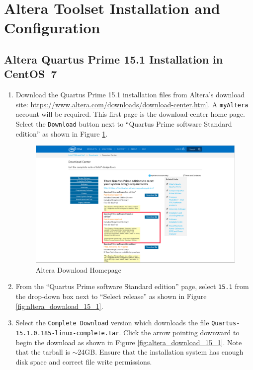 \newpage

\section{Altera Toolset Installation and Configuration}
\subsection{Altera Quartus Prime 15.1 Installation in CentOS~7}
\begin{flushleft}
\begin{enumerate}
\item Download the Quartus Prime 15.1 installation files from Altera's download site: \url{https://www.altera.com/downloads/download-center.html}. A \verb+myAltera+ account will be required. This first page is the download-center home page. Select the \verb+Download+ button next to ``Quartus Prime software Standard edition'' as shown in Figure \ref{fig:altera_download_center}.
\begin{figure}[ht]
	\centerline{\includegraphics[scale=0.4]{figures/altera_download_center}}
	\caption{Altera Download Homepage}
	\label{fig:altera_download_center}
\end{figure}
\item From the ``Quartus Prime software Standard edition'' page, select \verb+15.1+ from the drop-down box next to ``Select release'' as shown in Figure \ref{fig:altera_download_15_1}.
\item Select the \verb+Complete Download+ version which downloads the file \verb+Quartus-15.1.0.185-linux-complete.tar+. Click the arrow pointing downward to begin the download as shown in Figure \ref{fig:altera_download_15_1}. Note that the tarball is $\sim$24GB. Ensure that the installation system has enough disk space and correct file write permissions.\pagebreak

\end{enumerate}
\end{flushleft}
